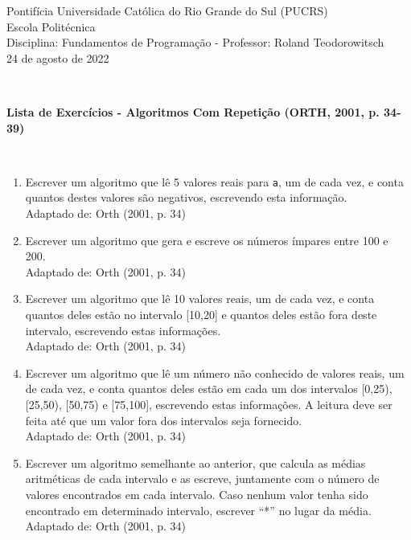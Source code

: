 \documentclass[onecolumn,a4paper,10pt]{report}
\newcommand{\+}{\, + \,}
\newcommand{\<}{\hspace*{-0.4cm}}
\begin{document}
\singlespacing

\begin{center}
Pontifícia Universidade Católica do Rio Grande do Sul (PUCRS)\\
Escola  Politécnica\\
Disciplina: Fundamentos de Programação - Professor: Roland Teodorowitsch\\
24 de agosto de 2022
\end{center}
~\\

\begin{center}
\textbf{Lista de Exercícios - Algoritmos Com Repetição (ORTH, 2001, p. 34-39)}
\end{center}
~\\

\begin{enumerate}[1.]

\item Escrever um algoritmo que lê 5 valores reais para \texttt{a}, um de cada vez, e conta quantos destes valores são negativos, escrevendo esta informação.\\
{\tiny Adaptado de: Orth (2001, p. 34)}

\item Escrever um algoritmo que gera e escreve os números ímpares entre 100 e 200.\\
{\tiny Adaptado de: Orth (2001, p. 34)}

\item Escrever um algoritmo que lê 10 valores reais, um de cada vez, e conta quantos deles estão no intervalo [10,20] e quantos deles estão fora deste intervalo, escrevendo estas informações.\\
{\tiny Adaptado de: Orth (2001, p. 34)}

\item Escrever um algoritmo que lê um número não conhecido de valores reais, um de cada vez, e conta quantos deles estão em cada um dos intervalos [0,25), [25,50), [50,75) e [75,100], escrevendo estas informações. A leitura deve ser feita até que um valor fora dos intervalos seja fornecido.\\
{\tiny Adaptado de: Orth (2001, p. 34)}

\item Escrever um algoritmo semelhante ao anterior, que calcula as médias aritméticas de cada intervalo e as escreve, juntamente com o número de valores encontrados em cada intervalo. Caso nenhum valor tenha sido encontrado em determinado intervalo, escrever ``*'' no lugar da média.\\
{\tiny Adaptado de: Orth (2001, p. 34)}


\end{enumerate}
\end{document}

